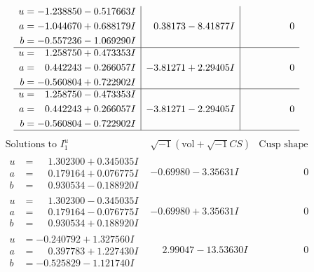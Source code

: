 \documentclass[1p]{elsarticle_modified}
\theoremstyle{definition}
\newcommand{\I}{\sqrt{-1}}
\begin{document}
$$\begin{array}{c|c|c}
\begin{aligned}
u &= -1.238850 - 0.517663 I \\
a &= -1.044670 + 0.688179 I \\
b &= -0.557236 - 1.069290 I\end{aligned}
 & \phantom{-}0.38173 - 8.41877 I & \phantom{-0.000000 } 0 \\ \hline\begin{aligned}
u &= \phantom{-}1.258750 + 0.473353 I \\
a &= \phantom{-}0.442243 - 0.266057 I \\
b &= -0.560804 + 0.722902 I\end{aligned}
 & -3.81271 + 2.29405 I & \phantom{-0.000000 } 0 \\ \hline\begin{aligned}
u &= \phantom{-}1.258750 - 0.473353 I \\
a &= \phantom{-}0.442243 + 0.266057 I \\
b &= -0.560804 - 0.722902 I\end{aligned}
 & -3.81271 - 2.29405 I & \phantom{-0.000000 } 0\\
 \hline 
 \end{array}$$\newpage$$\begin{array}{c|c|c}  
\text{Solutions to }I^u_{1}& \I (\text{vol} + \sqrt{-1}CS) & \text{Cusp shape}\\
 \hline 
\begin{aligned}
u &= \phantom{-}1.302300 + 0.345035 I \\
a &= \phantom{-}0.179164 + 0.076775 I \\
b &= \phantom{-}0.930534 - 0.188920 I\end{aligned}
 & -0.69980 - 3.35631 I & \phantom{-0.000000 } 0 \\ \hline\begin{aligned}
u &= \phantom{-}1.302300 - 0.345035 I \\
a &= \phantom{-}0.179164 - 0.076775 I \\
b &= \phantom{-}0.930534 + 0.188920 I\end{aligned}
 & -0.69980 + 3.35631 I & \phantom{-0.000000 } 0 \\ \hline\begin{aligned}
u &= -0.240792 + 1.327560 I \\
a &= \phantom{-}0.397783 + 1.227430 I \\
b &= -0.525829 - 1.121740 I\end{aligned}
 & \phantom{-}2.99047 - 13.53630 I & \phantom{-0.000000 } 0 \\ \hline\begin{aligned}

\end{aligned}
\end{array}$$
\end{document}
